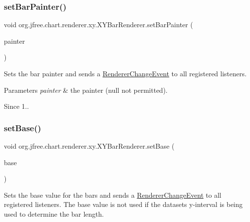 \subsubsection{\texorpdfstring{set\+Bar\+Painter()}{setBarPainter()}}
{\footnotesize\ttfamily void org.\+jfree.\+chart.\+renderer.\+xy.\+X\+Y\+Bar\+Renderer.\+set\+Bar\+Painter (\begin{DoxyParamCaption}\item[{\mbox{\hyperlink{interfaceorg_1_1jfree_1_1chart_1_1renderer_1_1xy_1_1_x_y_bar_painter}{X\+Y\+Bar\+Painter}}}]{painter }\end{DoxyParamCaption})}

Sets the bar painter and sends a \mbox{\hyperlink{}{Renderer\+Change\+Event}} to all registered listeners.


\begin{DoxyParams}{Parameters}
{\em painter} & the painter ({\ttfamily null} not permitted).\\
\hline
\end{DoxyParams}
\begin{DoxySince}{Since}
1.. 
\end{DoxySince}
\mbox{\label{classorg_1_1jfree_1_1chart_1_1renderer_1_1xy_1_1_x_y_bar_renderer_ad0902f54cf21048caccba61885f0f30d}} 
\subsubsection{\texorpdfstring{set\+Base()}{setBase()}}
{\footnotesize\ttfamily void org.\+jfree.\+chart.\+renderer.\+xy.\+X\+Y\+Bar\+Renderer.\+set\+Base (\begin{DoxyParamCaption}\item[{double}]{base }\end{DoxyParamCaption})}

Sets the base value for the bars and sends a \mbox{\hyperlink{}{Renderer\+Change\+Event}} to all registered listeners. The base value is not used if the dataset\textquotesingle{}s y-\/interval is being used to determine the bar length.


